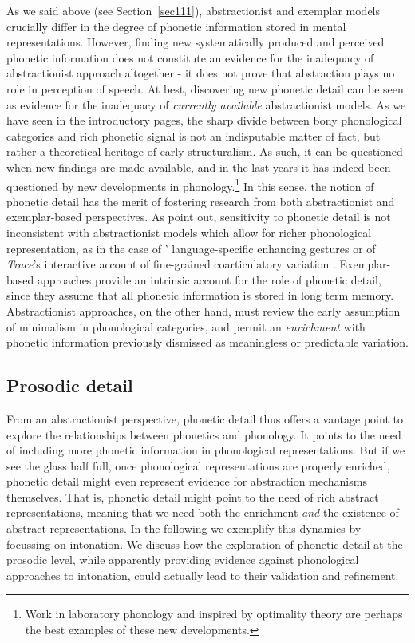 As we said above (see Section~\ref{sec111}), abstractionist and exemplar models crucially differ in the degree of phonetic information stored in mental representations. However, finding new systematically produced and perceived phonetic information does not constitute an evidence for the inadequacy of abstractionist approach altogether - it does not prove that abstraction plays no role in perception of speech. At best, discovering new phonetic detail can be seen as evidence for the inadequacy of \textit{currently available} abstractionist models. As we have seen in the introductory pages, the sharp divide between bony phonological categories and rich phonetic signal is not an indisputable matter of fact, but rather a theoretical heritage of early structuralism. As such, it can be questioned when new findings are made available, and in the last years it has indeed been questioned by new developments in phonology.\footnote{Work in laboratory phonology \citep{ohala1990interface,pierrehumbert1990phonological,pierrehumbert2000conceptual} and inspired by optimality theory \citep{flemming1997phonetic,flemming2001scalar} are perhaps the best examples of these new developments.} In this sense, the notion of phonetic detail has the merit of fostering research from both abstractionist and exemplar-based perspectives. As \citet{nguyen2009dynamical} point out, sensitivity to phonetic detail is not inconsistent with abstractionist models which allow for richer phonological representation, as in the case of \citeauthor{stevens2004invariance}' \citeyearpar{stevens2004invariance} language-specific enhancing gestures or of \textit{Trace}'s interactive account of fine-grained coarticulatory variation \citep{elman1988cognitive}. Exemplar-based approaches provide an intrinsic account for the role of phonetic detail, since they assume that all phonetic information is stored in long term memory. Abstractionist approaches, on the other hand, must review the early assumption of minimalism in phonological categories, and permit an \textit{enrichment} with phonetic information previously dismissed as meaningless or predictable variation.

\subsection{Prosodic detail}\label{sec113}
From an abstractionist perspective, phonetic detail thus offers a vantage point to explore the relationships between phonetics and phonology. It points to the need of including more phonetic information in phonological representations. But if we see the glass half full, once phonological representations are properly enriched, phonetic detail might even represent evidence for abstraction mechanisms themselves. That is, phonetic detail might point to the need of rich abstract representations, meaning that we need both the enrichment \textit{and} the existence of abstract representations. In the following we exemplify this dynamics by focussing on intonation. We discuss how the exploration of phonetic detail at the prosodic level, while apparently providing evidence against phonological approaches to intonation, could actually lead to their validation and refinement.

